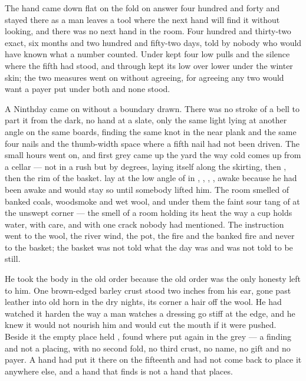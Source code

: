
The hand came down flat on the fold on answer four hundred and forty and stayed there as a man leaves a tool where the next hand will find it without looking, and there was no next hand in the room. Four hundred and thirty-two exact, six months and two hundred and fifty-two days, told by nobody who would have known what a number counted. Under   kept four low pulls and the silence where the fifth had stood, and through   kept its low over lower under the winter skin; the two measures went on without agreeing, for agreeing any two would want a payer put under both and none stood.

A Ninthday came on without a boundary drawn. There was no stroke of a bell to part it from the dark, no hand at a slate, only the same light lying at another angle on the same boards, finding the same knot in the near plank and the same four nails and the thumb-width space where a fifth nail had not been driven. The small hours went on, and first grey came up the yard the way cold comes up from a cellar --- not in a rush but by degrees, laying itself along the skirting, then , then the rim of the basket.  lay at the low angle of  in , , , , awake because he had been awake and would stay so until somebody lifted him. The room smelled of banked coals, woodsmoke and wet wool, and under them the faint sour tang of  at the unswept corner --- the smell of a room holding its heat the way a cup holds water, with care, and with one crack nobody had mentioned. The instruction went to the wool, the river wind, the pot, the fire and the banked fire and never to the basket; the basket was not told what the day was and was not told to be still.

He took the body in the old order because the old order was the only honesty left to him. One brown-edged barley crust stood two inches from his ear, gone past leather into old horn in the dry nights, its corner a hair off the wool. He had watched it harden the way a man watches a dressing go stiff at the edge, and he knew it would not nourish him and would cut the mouth if it were pushed. Beside it the empty place held , found where put again in the grey --- a finding and not a placing, with no second fold, no third crust, no name, no gift and no payer. A hand had put it there on the fifteenth and had not come back to place it anywhere else, and a hand that finds is not a hand that places.

